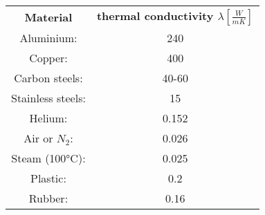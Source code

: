     \begin{tabular}{c c}
        \textbf{Material} & \textbf{thermal conductivity $ \lambda \left[\frac{W}{mK}\right]$}\\
        Aluminium: & 240\\
        Copper: & 400\\
        Carbon steels: & 40-60\\
        Stainless steels: & 15\\
        Helium: & 0.152\\
        Air or $N_2$: & 0.026\\
        Steam (100°C): & 0.025\\
        Plastic: & 0.2\\
        Rubber: & 0.16\\
    \end{tabular}